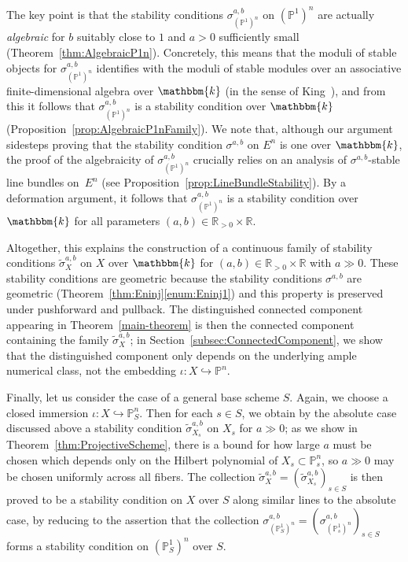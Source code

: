 \documentclass[11pt, reqno]{amsart}
\numberwithin{equation}{section}
\theoremstyle{plain}
\theoremstyle{remark}
\theoremstyle{definition}
\theoremstyle{italicsname}
\newcommand{\wtilde}{\widetilde}
\newcommand{\KK}{\mathbbm{k}}
\def\RR{\ensuremath{\mathbb{R}}}
\def\PP{\ensuremath{\mathbb{P}}}
\begin{document}
The key point is that the stability conditions $\sigma_{(\PP^1)^n}^{a,b}$ on $(\PP^1)^n$ are actually \emph{algebraic} for $b$ suitably close to $1$ and $a>0$ sufficiently small (Theorem~\ref{thm:AlgebraicP1n}).
Concretely, this means that the moduli of stable objects for $\sigma_{(\PP^1)^n}^{a,b}$ identifies with the moduli of  stable modules over an associative finite-dimensional algebra over $\KK$ (in the sense of King~\cite{King}), and from this it follows that $\sigma_{(\PP^1)^n}^{a,b}$ is a stability condition over $\KK$ (Proposition~\ref{prop:AlgebraicP1nFamily}). 
We note that, although our argument sidesteps proving that the stability condition $\sigma^{a,b}$ on $E^n$ is one over $\KK$, the proof of the algebraicity of $\sigma_{(\PP^1)^n}^{a,b}$ crucially relies on an analysis of $\sigma^{a,b}$-stable line bundles on~$E^n$ (see Proposition~\ref{prop:LineBundleStability}). 
By a deformation argument, it follows that $\sigma_{(\PP^1)^n}^{a,b}$ is a stability condition over $\KK$ for all parameters $(a,b) \in \RR_{>0} \times \RR$.

Altogether, this explains the construction of a continuous family of stability conditions $\wtilde{\sigma}^{a,b}_X$ on $X$ over $\KK$ for $(a, b) \in \RR_{>0} \times \RR$ with $a \gg 0$. 
These stability conditions are geometric because the stability conditions $\sigma^{a,b}$ are geometric  (Theorem~\ref{thm:Eninj}\ref{enum:Eninj1}) and this property is preserved under pushforward and pullback. 
The distinguished connected component appearing in Theorem~\ref{main-theorem} is then the connected component containing the family $\wtilde{\sigma}_X^{a,b}$; 
in Section~\ref{subsec:ConnectedComponent}, we show that the distinguished component only depends on the underlying ample numerical class, not the embedding $\iota \colon X \hookrightarrow \PP^n$. 

Finally, let us consider the case of a general base scheme $S$. 
Again, we choose a closed immersion $\iota \colon X \hookrightarrow \PP^n_S$. 
Then for each $s \in S$, we obtain by the absolute case discussed above a stability condition $\wtilde{\sigma}_{X_s}^{a,b}$ on $X_s$ for $a \gg 0$; as we show in Theorem~\ref{thm:ProjectiveScheme}, there is a bound for how large $a$ must be chosen which depends only on the Hilbert polynomial of $X_s \subset \PP^n_s$, so $a \gg 0$ may be chosen uniformly across all fibers. 
The collection $\wtilde{\sigma}^{a,b}_X = (\wtilde{\sigma}_{X_s}^{a,b})_{s \in S}$ is then proved to be a stability condition on $X$ over $S$ along similar lines to the absolute case, by 
reducing to the assertion that the collection $\sigma^{a,b}_{(\PP^1_S)^n} = (\sigma^{a,b}_{(\PP^1_s)^n})_{s \in S}$ forms a stability condition on $(\PP^1_S)^n$ over $S$.
\end{document}
